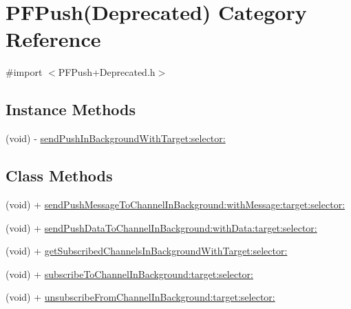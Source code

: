 \hypertarget{category_p_f_push_07_deprecated_08}{}\section{P\+F\+Push(Deprecated) Category Reference}
\label{category_p_f_push_07_deprecated_08}


{\ttfamily \#import $<$P\+F\+Push+\+Deprecated.\+h$>$}

\subsection*{Instance Methods}
\begin{DoxyCompactItemize}
\item 
(void) -\/ \hyperlink{category_p_f_push_07_deprecated_08_a065a1a249c7b222175a396dd791d7949}{send\+Push\+In\+Background\+With\+Target\+:selector\+:}
\end{DoxyCompactItemize}
\subsection*{Class Methods}
\begin{DoxyCompactItemize}
\item 
(void) + \hyperlink{category_p_f_push_07_deprecated_08_a2d43569d4b36fd0a5de8c660516cc965}{send\+Push\+Message\+To\+Channel\+In\+Background\+:with\+Message\+:target\+:selector\+:}
\begin{DoxyCompactList}\small\item\em 

 \end{DoxyCompactList}\item 
(void) + \hyperlink{category_p_f_push_07_deprecated_08_a070298e87ef7343de2ec870446200d0b}{send\+Push\+Data\+To\+Channel\+In\+Background\+:with\+Data\+:target\+:selector\+:}
\item 
(void) + \hyperlink{category_p_f_push_07_deprecated_08_abd7166ef5c38590d9ab6a29e98b9ace7}{get\+Subscribed\+Channels\+In\+Background\+With\+Target\+:selector\+:}
\begin{DoxyCompactList}\small\item\em 

 \end{DoxyCompactList}\item 
(void) + \hyperlink{category_p_f_push_07_deprecated_08_a8cbea9ad99b6403e9f91bab7d68bead3}{subscribe\+To\+Channel\+In\+Background\+:target\+:selector\+:}
\item 
(void) + \hyperlink{category_p_f_push_07_deprecated_08_a929d5a6cf42c21a8ff3abc3fb3659647}{unsubscribe\+From\+Channel\+In\+Background\+:target\+:selector\+:}
\end{DoxyCompactItemize}


